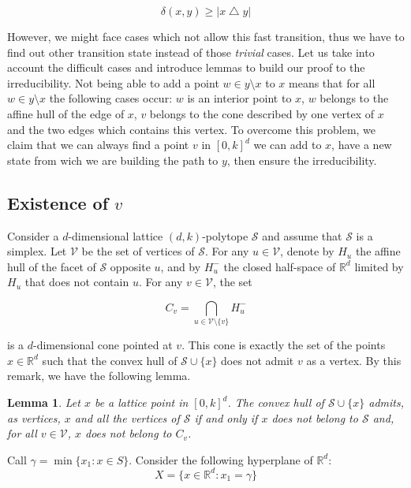 \documentclass[a4paper]{article}
\newtheorem{lemma}{Lemma}[subsection]
\renewcommand{\S}{\mathcal{S}}
\begin{document}
\begin{equation}
  \delta(x,y) \geq{|x \bigtriangleup y|}
\end{equation}

However, we might face cases which not allow this fast transition, thus we have to find out other transition state instead of those \textit{trivial} cases. Let us take into account the difficult cases and introduce lemmas to build our proof to the irreducibility. Not being able to add a point $w \in y \setminus x$ to $x$ means that for all $w \in y \setminus x$ the following cases occur: $w$ is an interior point to $x$, $w$ belongs to the affine hull of the edge of $x$, $v$ belongs to the cone described by one vertex of $x$ and the two edges which contains this vertex. To overcome this problem, we claim that we can always find a point $v$ in $[0,k]^d$ we can add to $x$, have a new state from wich we are building the path to $y$, then ensure the irreducibility.

\subsection{Existence of $v$}

Consider a $d$-dimensional lattice $(d,k)$-polytope $\S$ and assume that $\S$ is a simplex. Let $\mathcal{V}$ be the set of vertices of $\S$. For any $u\in\mathcal{V}$, denote by $H_u$ the affine hull of the facet of $\S$ opposite $u$, and by $H_u^-$ the closed half-space of $\mathbb{R}^d$ limited by $H_u$ that does not contain $u$.
For any $v\in\mathcal{V}$, the set

\begin{equation}
  C_v=\bigcap_{u\in\mathcal{V}\mathord{\setminus}\{v\}}H_u^-
\end{equation}

is a $d$-dimensional cone pointed at $v$. This cone is exactly the set of the points $x\in\mathbb{R}^d$ such that the convex hull of $\S\cup\{x\}$ does not admit $v$ as a vertex. By this remark, we have the following lemma.

\begin{lemma}\label{Lem.A}
Let $x$ be a lattice point in $[0,k]^d$. The convex hull of $\S\cup\{x\}$ admits, as vertices, $x$ and all the vertices of $\S$ if and only if $x$ does not belong to $\S$ and, for all $v\in\mathcal{V}$, $x$ does not belong to $C_v$.
\end{lemma}

Call $\gamma=\min\{x_1:x\in{S}\}$. Consider the following hyperplane of $\mathbb{R}^d$:
$$
X=\{x\in\mathbb{R}^d:x_1=\gamma\}
$$
\end{document}
